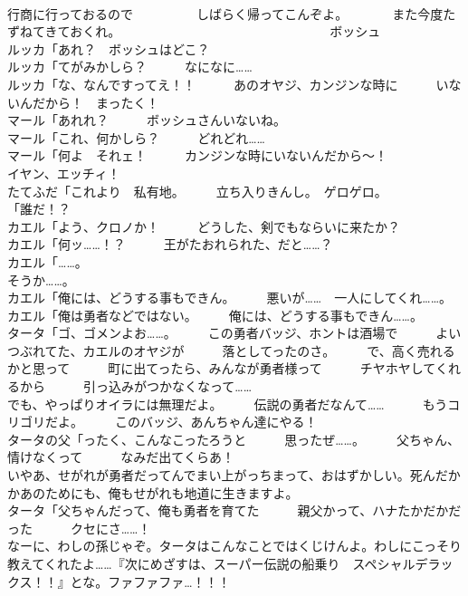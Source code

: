 \documentclass[8pt]{extreport}
\begin{document}
\begin{CJK}{UTF8}{min}
\\	行商に行っておるので　　　　　しばらく帰ってこんぞよ。　　　　また今度たずねてきておくれ。　　　　　　　　　　　　　　　　　ボッシュ	
\\	ルッカ「あれ？　ボッシュはどこ？	
\\	ルッカ「てがみかしら？　　　なになに……	
\\	ルッカ「な、なんですってえ！！　　　あのオヤジ、カンジンな時に　　　いないんだから！　まったく！	
\\	マール「あれれ？　　　ボッシュさんいないね。	
\\	マール「これ、何かしら？　　　どれどれ……	
\\	マール「何よ　それェ！　　　カンジンな時にいないんだから～！	
\\	イヤン、エッチィ！	
\\	たてふだ「これより　私有地。　　　立ち入りきんし。　ゲロゲロ。	
\\	「誰だ！？	
\\	カエル「よう、クロノか！　　　どうした、剣でもならいに来たか？	
\\	カエル「何ッ……！？　　　王がたおれられた、だと……？	
\\	カエル「……。	
\\	そうか……。	
\\	カエル「俺には、どうする事もできん。　　　悪いが……　一人にしてくれ……。	
\\	カエル「俺は勇者などではない。　　　俺には、どうする事もできん……。	
\\	タータ「ゴ、ゴメンよお……。　　　この勇者バッジ、ホントは酒場で　　　よいつぶれてた、カエルのオヤジが　　　落としてったのさ。　　　で、高く売れるかと思って　　　町に出てったら、みんなが勇者様って　　　チヤホヤしてくれるから　　　引っ込みがつかなくなって……	
\\	でも、やっぱりオイラには無理だよ。　　　伝説の勇者だなんて……　　　もうコリゴリだよ。　　　このバッジ、あんちゃん達にやる！	
\\	タータの父「ったく、こんなこったろうと　　　思ったぜ……。　　　父ちゃん、情けなくって　　　なみだ出てくらあ！	
\\	いやあ、せがれが勇者だってんでまい上がっちまって、おはずかしい。死んだかかあのためにも、俺もせがれも地道に生きますよ。	
\\	タータ「父ちゃんだって、俺も勇者を育てた　　　親父かって、ハナたかだかだった　　　クセにさ……！	
\\	なーに、わしの孫じゃぞ。タータはこんなことではくじけんよ。わしにこっそり教えてくれたよ……『次にめざすは、スーパー伝説の船乗り　スペシャルデラックス！！』とな。ファファファ…！！！	

\end{CJK}
\end{document}

